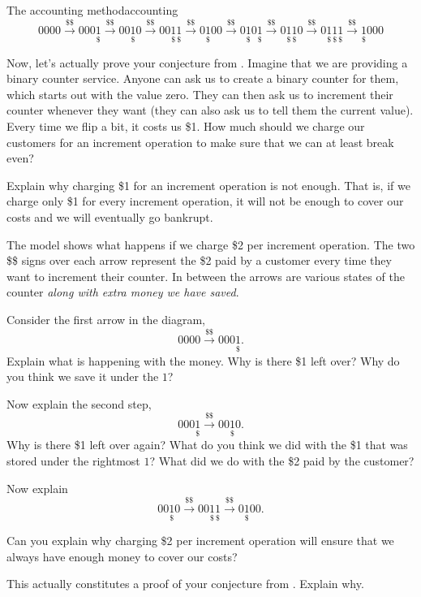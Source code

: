 \documentclass{tufte-handout}
\begin{document}
\pause

\newcommand{\one}{\underset{\$}{1}}
\newcommand{\pay}{\overset{\$\$}{\longrightarrow}}

\begin{model*}{The accounting method}{accounting}
  \[ 0000 \pay 000\one \pay 00\one 0 \pay 00\one\one \pay 0 \one 00 \pay
     0\one 0\one \pay 0\one \one 0 \pay 0 \one\one\one \pay \one 000
  \]
\end{model*}

Now, let's actually prove your conjecture from .
Imagine that we are providing a binary counter
service.  Anyone can ask us to create a
binary counter for them, which starts out with the value zero. They
can then ask us to increment their counter whenever they want (they
can also ask us to tell them the current value).  Every time we flip a
bit, it costs us \$1.  How much should we charge our customers for an
increment operation to make sure that we can at least break even?

\begin{questions}
  \item Explain why charging \$1 for an increment operation is not
    enough.  That is, if we charge only \$1 for every increment
    operation, it will not be enough to cover our costs and we will
    eventually go bankrupt.
\end{questions}

The model shows what happens if we charge \$2 per increment
operation. The two \$\$ signs over each arrow represent the \$2 paid
by a customer every time they want to increment their counter.  In
between the arrows are various states of the counter \emph{along with
  extra money we have saved}.

\begin{questions}
  \item Consider the first arrow in the diagram, \[ 0000 \pay
      000\one. \] Explain what is happening with the money.  Why is
    there \$1 left over? Why do you think we save it under the $1$?

  \item Now explain the second step, \[ 000\one \pay 00\one 0. \] Why
    is there \$1 left over again?  What do you think we did with the
    \$1 that was stored under the rightmost $1$?  What did we do with
    the \$2 paid by the customer?

  \item Now explain \[ 00\one 0 \pay 00\one\one \pay 0\one 00. \]

  \item Can you explain why charging \$2 per increment operation will
    ensure that we always have enough money to cover our costs?

  \item This actually constitutes a proof of your conjecture from
    .  Explain why.
\end{questions}
\end{document}
